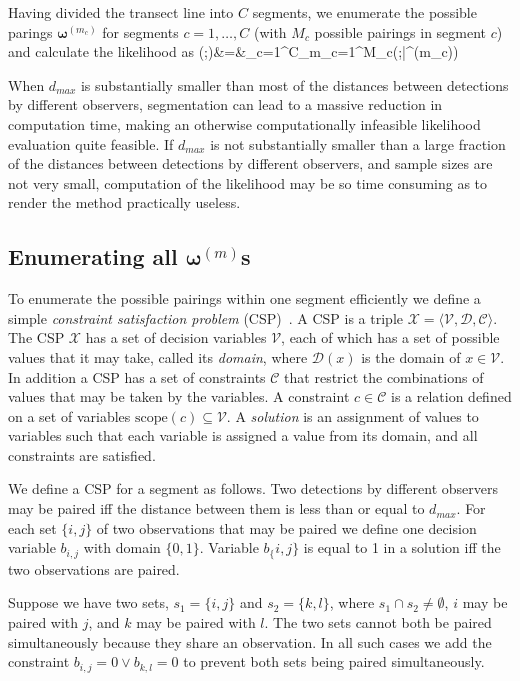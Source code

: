 \documentclass[useAMS, usenatbib, referee]{biom}
\begin{document}
Having divided the transect line into $C$ segments, we enumerate the possible parings $\bm{\omega}^{(m_c)}$ for segments $c=1,\ldots,C$ (with $M_c$ possible pairings in segment $c$) and calculate the likelihood as 
\be
{}(\bm{\theta};)&=&\prod_{c=1}^C\sum_{m_c=1}^{M_c}(\bm{\theta};|\bm{\omega}^{(m_c)})
\ee

When $d_{max}$ is substantially smaller than most of the distances between detections by different observers, segmentation can lead to a massive reduction in computation time, making an otherwise computationally infeasible likelihood evaluation quite feasible. If $d_{max}$ is not substantially smaller than a large fraction of the distances between detections by different observers, and sample sizes are not very small, computation of the likelihood may be so time consuming as to render the method practically useless.

\subsection{Enumerating all $\bm{\omega}^{(m)}$s}
\label{sec:constrprog}

To enumerate the possible pairings within one segment efficiently we define a simple \textit{constraint satisfaction problem} (CSP)~\cite[Chapter 6]{russell-norvig-aima3}. A CSP is a triple \(\mathcal{X}=\langle \mathcal{V}, \mathcal{D}, \mathcal{C} \rangle\).  The CSP \(\mathcal{X}\) has a set of decision variables \(\mathcal{V}\), each of which has a set of possible values that it may take, called its \textit{domain}, where \(\mathcal{D}(x)\) is the domain of \(x \in \mathcal{V}\). In addition a CSP has a set of constraints \(\mathcal{C}\) that restrict the combinations of values that may be taken by the variables. A constraint \(c\in \mathcal{C}\) is a relation defined on a set of variables \(\mathrm{scope}(c)\subseteq \mathcal{V}\). A \textit{solution} is an assignment of values to variables such that each variable is assigned a value from its domain, and all constraints are satisfied. 

We define a CSP for a segment as follows. 
Two detections by different observers may be paired iff the distance between them is less than or equal to \(d_{max}\). For each set \(\{i,j\}\) of two observations that may be paired we define one decision variable \(b_{i,j}\) with domain \(\{0,1\}\). Variable \(b_\{i,j\}\) is equal to 1 in a solution iff the two observations are paired. 

Suppose we have two sets, \(s_1=\{i,j\}\) and \(s_2=\{k,l\}\), where \(s_1 \cap s_2 \ne \emptyset\), \(i\) may be paired with \(j\), and \(k\) may be paired with \(l\). The two sets cannot both be paired simultaneously because they share an observation. In all such cases we add the constraint \(b_{i,j}=0 \vee b_{k,l}=0\) to prevent both sets being paired simultaneously. 
\end{document}
